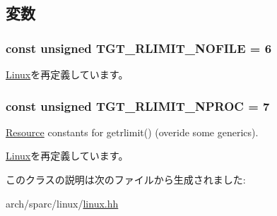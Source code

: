 \subsection{変数}
\hypertarget{classSparc32Linux_a7eca1a56bf2a00dce74320c95a0b176e}{
\subsubsection[{TGT\_\-RLIMIT\_\-NOFILE}]{\setlength{\rightskip}{0pt plus 5cm}const unsigned {\bf TGT\_\-RLIMIT\_\-NOFILE} = 6}}
\label{classSparc32Linux_a7eca1a56bf2a00dce74320c95a0b176e}


\hyperlink{classLinux_a7eca1a56bf2a00dce74320c95a0b176e}{Linux}を再定義しています。\hypertarget{classSparc32Linux_af16b609dcc51ebef365e8258e28d777c}{
\subsubsection[{TGT\_\-RLIMIT\_\-NPROC}]{\setlength{\rightskip}{0pt plus 5cm}const unsigned {\bf TGT\_\-RLIMIT\_\-NPROC} = 7}}
\label{classSparc32Linux_af16b609dcc51ebef365e8258e28d777c}


\hyperlink{classResource}{Resource} constants for getrlimit() (overide some generics). 

\hyperlink{classLinux_af16b609dcc51ebef365e8258e28d777c}{Linux}を再定義しています。

このクラスの説明は次のファイルから生成されました:\begin{DoxyCompactItemize}
\item 
arch/sparc/linux/\hyperlink{arch_2sparc_2linux_2linux_8hh}{linux.hh}\end{DoxyCompactItemize}
